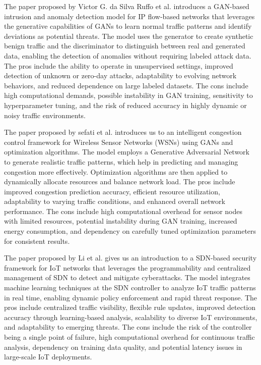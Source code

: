 \documentclass[a4paper,fleqn]{cas-dc}
\numberwithin{equation}{section}
\begin{document}
The paper proposed by Victor G. da Silva Ruffo et al.\cite{daSilvaRuffo2025} introduces a GAN-based intrusion and anomaly detection model for IP flow-based networks that leverages the generative capabilities of GANs to learn normal traffic patterns and identify deviations as potential threats. The model uses the generator to create synthetic benign traffic and the discriminator to distinguish between real and generated data, enabling the detection of anomalies without requiring labeled attack data. The pros include the ability to operate in unsupervised settings, improved detection of unknown or zero-day attacks, adaptability to evolving network behaviors, and reduced dependence on large labeled datasets. The cons include high computational demands, possible instability in GAN training, sensitivity to hyperparameter tuning, and the risk of reduced accuracy in highly dynamic or noisy traffic environments.

The paper proposed by sefati et al.\cite{Sefati2025} introduces us to an intelligent congestion control framework for Wireless Sensor Networks (WSNs) using GANs and optimization algorithms. The model employs a Generative Adversarial Network to generate realistic traffic patterns, which help in predicting and managing congestion more effectively. Optimization algorithms are then applied to dynamically allocate resources and balance network load. The pros include improved congestion prediction accuracy, efficient resource utilization, adaptability to varying traffic conditions, and enhanced overall network performance. The cons include high computational overhead for sensor nodes with limited resources, potential instability during GAN training, increased energy consumption, and dependency on carefully tuned optimization parameters for consistent results.

The paper proposed by Li et al.\cite{Li2025} gives us an introduction to a SDN-based security framework for IoT networks that leverages the programmability and centralized management of SDN to detect and mitigate cyberattacks. The model integrates machine learning techniques at the SDN controller to analyze IoT traffic patterns in real time, enabling dynamic policy enforcement and rapid threat response. The pros include centralized traffic visibility, flexible rule updates, improved detection accuracy through learning-based analysis, scalability to diverse IoT environments, and adaptability to emerging threats. The cons include the risk of the controller being a single point of failure, high computational overhead for continuous traffic analysis, dependency on training data quality, and potential latency issues in large-scale IoT deployments. 
\end{document}
